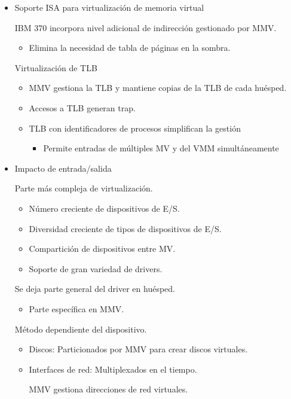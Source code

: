 \documentclass[12pt, twoside, openright]{report} %
\begin{document}
\begin{itemize}
	\item Soporte ISA para virtualización de memoria virtual

	      IBM 370 incorpora nivel adicional de indirección
	      gestionado por MMV.
	      \begin{itemize}
		      \item Elimina la necesidad de tabla de páginas en la sombra.
	      \end{itemize}

	      Virtualización de TLB
	      \begin{itemize}
		      \item MMV gestiona la TLB y mantiene copias de la TLB de cada
		            huésped.
		      \item Accesos a TLB generan trap.
		      \item TLB con identificadores de procesos simplifican la gestión
		            \begin{itemize}
			            \item Permite entradas de múltiples MV y del VMM
			                  simultáneamente
		            \end{itemize}
	      \end{itemize}
	\item Impacto de entrada/salida

	      Parte más compleja de virtualización.
	      \begin{itemize}
		      \item Número creciente de dispositivos de E/S.
		      \item Diversidad creciente de tipos de dispositivos de E/S.
		      \item Compartición de dispositivos entre MV.
		      \item Soporte de gran variedad de drivers.
	      \end{itemize}


	      Se deja parte general del driver en huésped.
	      \begin{itemize}
		      \item Parte específica en MMV.
	      \end{itemize}

	      Método dependiente del dispositivo.
	      \begin{itemize}
		      \item Discos: Particionados por MMV para crear discos
		            virtuales.
		      \item Interfaces de red: Multiplexados en el tiempo.

		            MMV gestiona direcciones de red virtuales.
	      \end{itemize}


\end{itemize}
\end{document}

